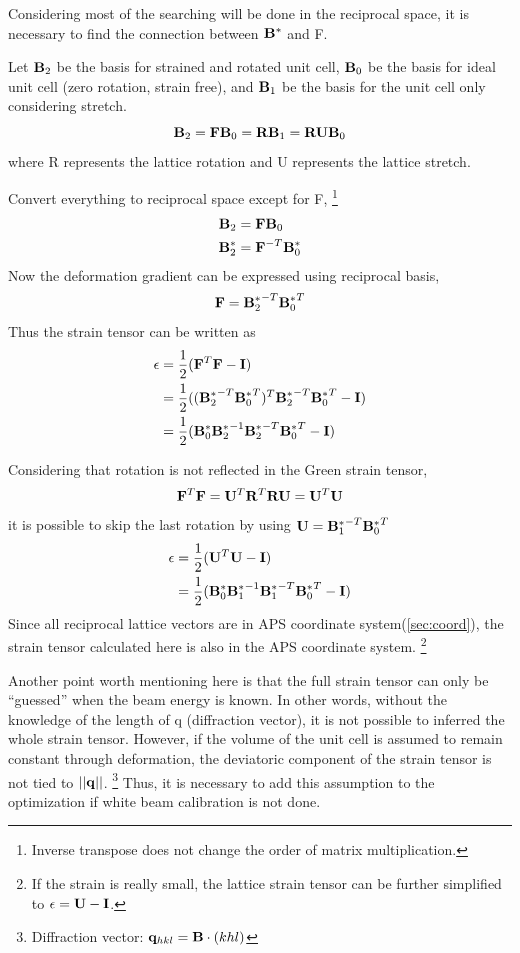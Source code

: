 \documentclass[12pt]{scrartcl}
\begin{document}
\begin{enumerate}
Considering most of the searching will be done in the reciprocal space, it is necessary to find the connection between $\mathbf{B}^*$ and \tnsr F.

Let $\mathbf{B}_2$ be the basis for strained and rotated unit cell, $\mathbf{B}_0$ be the basis for ideal unit cell (zero rotation, strain free), and $\mathbf{B}_1$ be the basis for the unit cell only considering stretch.
\[
	\mathbf{B}_2 = \mathbf{F} \mathbf{B}_0 = \mathbf{R} \mathbf{B}_1 = \mathbf{R} \mathbf{U} \mathbf{B}_0
\]
where \tnsr R represents the lattice rotation and \tnsr U represents the lattice stretch.

Convert everything to reciprocal space except for \tnsr F,
\footnote{Inverse transpose does not change the order of matrix multiplication.}
\begin{align*}
	\mathbf{B}_2 &= \mathbf{F} \mathbf{B}_0 \\
	\mathbf{B}^*_2 &= \mathbf{F}^{-T} \mathbf{B}_0^*
\end{align*}
Now the deformation gradient can be expressed using reciprocal basis,
\[
	\mathbf{F} = {\mathbf{B}_2^*}^{-T} {\mathbf{B}_0^*}^T
\]
Thus the strain tensor can be written as
\begin{align*}
	\epsilon &= \dfrac{1}{2} (\mathbf{F}^T\mathbf{F} - \mathbf{I}) \\
	              &= \dfrac{1}{2} ( ({\mathbf{B}_2^*}^{-T} {\mathbf{B}_0^*}^T)^T{\mathbf{B}_2^*}^{-T} {\mathbf{B}_0^*}^T - \mathbf{I}) \\
	              &= \dfrac{1}{2} ( \mathbf{B}_0^* {\mathbf{B}_2^*}^{-1} {\mathbf{B}_2^*}^{-T} {\mathbf{B}_0^*}^T  - \mathbf{I})
\end{align*}

Considering that rotation is not reflected in the Green strain tensor,
\[
	\mathbf{F}^T \mathbf{F} = \mathbf{U}^T \mathbf{R}^T \mathbf{R} \mathbf{U} = \mathbf{U}^T \mathbf{U}
\]
it is possible to skip the last rotation by using $\mathbf{U} =  {\mathbf{B}_1^*}^{-T} {\mathbf{B}_0^*}^T$
\begin{align*}
	\epsilon &=  \dfrac{1}{2} (\mathbf{U}^T\mathbf{U} - \mathbf{I}) \\
	              &=  \dfrac{1}{2} ( \mathbf{B}_0^* {\mathbf{B}_1^*}^{-1} {\mathbf{B}_1^*}^{-T} {\mathbf{B}_0^*}^T  - \mathbf{I})
\end{align*}
Since all reciprocal lattice vectors are in APS coordinate system(\cref{sec:coord}), the strain tensor calculated here is also in the APS coordinate system.
\footnote{If the strain is really small, the lattice strain tensor can be further simplified to $\epsilon = \mathbf{U} - \mathbf{I}$.} 

Another point worth mentioning here is that the full strain tensor can only be ``guessed'' when the beam energy is known.
In other words, without the knowledge of the length of \tnsr q (diffraction vector), it is not possible to inferred the whole strain tensor.
However, if the volume of the unit cell is assumed to remain constant through deformation, the deviatoric component of the strain tensor is not tied to $||\mathbf{q}||$.
\footnote{Diffraction vector: $\mathbf{q}_{hkl} = \mathbf{B} \cdot (khl) $}
Thus, it is necessary to add this assumption to the optimization if white beam calibration is not done.


\end{enumerate}
\end{document}
